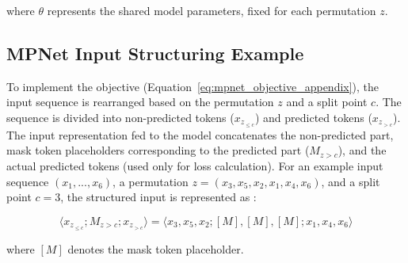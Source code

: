\documentclass[10pt,oneside]{report}
\renewcommand{\citet}[1]{\citeauthor{#1}, \citeyear{#1}}
\begin{document}
where $\theta$ represents the shared model parameters, fixed for each permutation $z$.


\subsection{MPNet Input Structuring Example}

To implement the objective (Equation~\ref{eq:mpnet_objective_appendix}), the input sequence is rearranged based on the permutation $z$ and a split point $c$. The sequence is divided into non-predicted tokens ($x_{z_{\le c}}$) and predicted tokens ($x_{z_{>c}}$). The input representation fed to the model concatenates the non-predicted part, mask token placeholders corresponding to the predicted part ($M_{z>c}$), and the actual predicted tokens (used only for loss calculation). For an example input sequence $(x_1, ..., x_6)$, a permutation $z=(x_3, x_5, x_2, x_1, x_4, x_6)$, and a split point $c=3$, the structured input is represented as \cite{song2020mpnet}:

\begin{equation} \label{eq:mpnet_input_appendix}
\langle x_{z_{\le c}}; M_{z>c}; x_{z_{>c}} \rangle = \langle x_3, x_5, x_2; [M], [M], [M]; x_1, x_4, x_6 \rangle
\end{equation}

where $[M]$ denotes the mask token placeholder.

%
\end{document}
